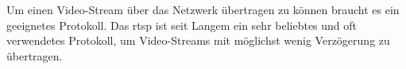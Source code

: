 Um einen Video-Stream über das Netzwerk übertragen zu können braucht es ein geeignetes Protokoll.
Das \ac{rtsp} ist seit Langem ein sehr beliebtes und oft verwendetes Protokoll, um Video-Streams mit möglichst wenig Verzögerung zu übertragen.
\cite[vgl.][]{ieft-rtsp}